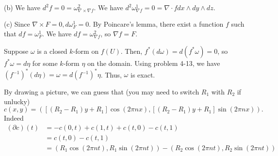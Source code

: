 \documentclass[11pt]{scrartcl}
\begin{document}
(b) We have $d^2f = 0 = \omega^2_{\nabla\times\nabla f}$.
We have $d^2\omega^1_{\nabla f} = 0 = \nabla\cdot f dx\wedge dy\wedge dz$.

(c) Since $\nabla\times F = 0, d\omega^1_F = 0$.
By Poincare's lemma, there exist a function $f$ such that $df = \omega^1_F$.
We have $df = \omega^2_{\nabla f}$, so $\nabla f = F$.

\begin{problem*}[4-20]
\end{problem*}
Suppose $\omega$ is a closed $k$-form on $f(U)$.
Then, $f^*(d\omega) = d(f^*\omega) = 0$, so $f^*\omega = d\eta$ for some $k$-form $\eta$ on the domain.
Using problem 4-13, we have $(f^{-1})^*(d\eta) = \omega = d(f^{-1})^*\eta$.
Thus, $\omega$ is exact.

\begin{problem*}[4-23]
\end{problem*}
By drawing a picture, we can guess that (you may need to switch $R_1$ with $R_2$ if unlucky)
$$
    c(x, y) = ([(R_2 - R_1)y + R_1]\cos(2\pi nx), [(R_2 - R_1)y + R_1]\sin(2\pi nx)).
$$
Indeed 
\begin{align*}
    (\partial c)(t) 
    &=
    -c(0, t) + c(1, t) + c(t, 0) - c(t, 1) \\
    &=
    c(t, 0) - c(t, 1) \\
    &=
    (R_1\cos(2\pi nt), R_1\sin(2\pi nt))
    -
    (R_2\cos(2\pi nt), R_2\sin(2\pi nt))
\end{align*}
\end{document}
